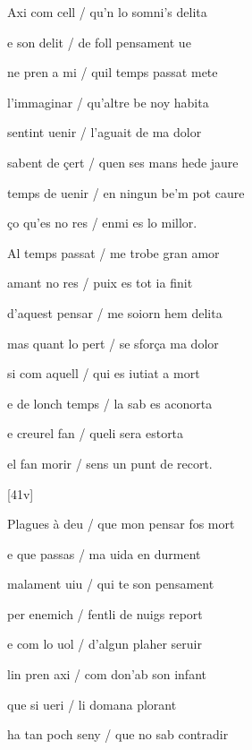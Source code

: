 



\begin{estrofa}

 Axi com cell / qu'n lo somni's delita

 e son delit / de foll pensament ue

 ne pren a mi / quil temps passat mete

 l'immaginar / qu'altre be noy habita

 sentint uenir / l'aguait de ma dolor

 sabent de \c{c}ert / quen ses mans hede jaure

 temps de uenir / en ningun be'm pot caure

 \c{c}o qu'es no res / enmi es lo millor.

\end{estrofa}



\begin{estrofa}

 Al temps passat / me trobe gran amor

 amant no res / puix es tot ia finit

 d'aquest pensar / me soiorn hem delita

 mas quant lo pert / se sfor\c{c}a ma dolor

 si com aquell / qui es iutiat a mort

 e de lonch temps / la sab es aconorta

 e creurel fan / queli sera estorta

 el fan morir / sens un punt de recort.

\end{estrofa}



[41v]
\begin{estrofa}

 Plagues \`{a} deu / que mon pensar fos mort

 e que passas / ma uida en durment

 malament uiu / qui te son pensament

 per enemich / fentli de nuigs report

 e com lo uol / d'algun plaher seruir

 lin pren axi / com don'ab son infant

 que si ueri / li domana plorant

 ha tan poch seny / que no sab contradir

\end{estrofa}



